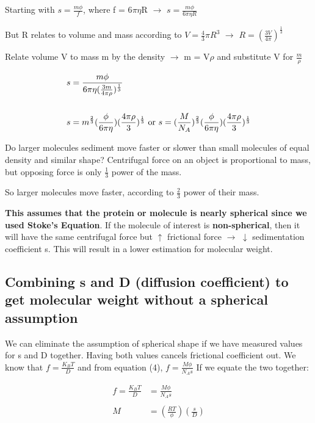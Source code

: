 \documentclass[12pt, letterpaper]{article}
\begin{document}
    Starting with \(s = \frac{m\phi}{f} \), where f = 6$\pi\eta$R $\rightarrow$ \(s = \frac{m\phi}{6\pi \eta R}\)

    But R relates to volume and mass according to \(V = \frac{4}{3} \pi R^3 \) $\rightarrow$ \(R = (\frac{3V}{4 \pi})^{\frac{1}{3}} \)

    Relate volume V to mass m by the density $\rightarrow$ m = V$\rho$ and substitute V for $\frac{m}{\rho}$

    \begin{align*}
        s &= \frac{m \phi}{6 \pi \eta (\frac{3m}{4 \pi \rho})^{\frac{1}{3}}} \\ \\
       s &= m^{\frac{2}{3}} (\frac{\phi}{6 \pi \eta}) (\frac{4 \pi \rho}{3})^{\frac{1}{3}}  \hbox{ or } s = (\frac{M}{N_A})^{\frac{2}{3}} (\frac{\phi}{6 \pi \eta})(\frac{4 \pi \rho}{3})^{\frac{1}{3}}
    \end{align*}

    Do larger molecules sediment move faster or slower than small molecules of equal density and similar shape? Centrifugal force on an object 
    is proportional to mass, but opposing force is only $\frac{1}{3}$ power of the mass. 
    
    So larger molecules move faster, according to $\frac{2}{3}$ power of their mass.

    \textbf{This assumes that the protein or molecule is nearly spherical since we used Stoke's Equation}. If 
    the molecule of interest is \textbf{non-spherical}, then it will have the same centrifugal force but $\uparrow$ frictional 
    force $\rightarrow$ $\downarrow$ sedimentation coefficient s. This will result in a lower estimation for molecular 
    weight. 

    \subsection*{Combining s and D (diffusion coefficient) to get molecular weight without a spherical assumption}

    We can eliminate the assumption of spherical shape if we have measured values for s and D together. Having both values 
    cancels frictional coefficient out. We know that \(f = \frac{K_B T}{D} \) and from equation (4), \(f = \frac{M \phi}{N_A s} \) 
    If we equate the two together: 

    \begin{align*}
        f = \frac{K_B T}{D} &= \frac{M \phi}{N_A s} \\ \\
        M &= (\frac{RT}{\phi})(\frac{s}{D})
    \end{align*}
\end{document}
